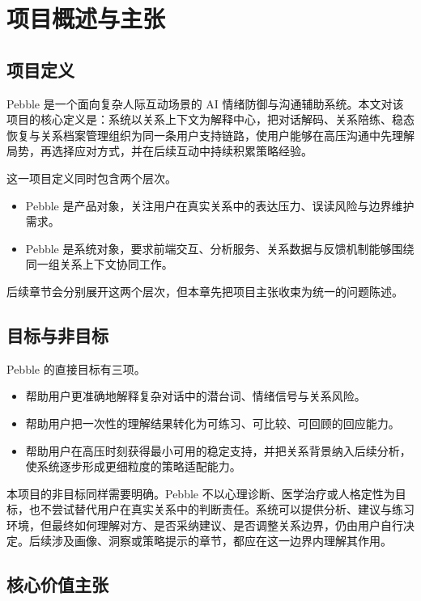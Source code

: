 \chapter{项目概述与主张}

\section{项目定义}

Pebble 是一个面向复杂人际互动场景的 AI 情绪防御与沟通辅助系统。本文对该项目的核心定义是：系统以关系上下文为解释中心，把对话解码、关系陪练、稳态恢复与关系档案管理组织为同一条用户支持链路，使用户能够在高压沟通中先理解局势，再选择应对方式，并在后续互动中持续积累策略经验。

这一项目定义同时包含两个层次。

\begin{itemize}
  \item Pebble 是产品对象，关注用户在真实关系中的表达压力、误读风险与边界维护需求。
  \item Pebble 是系统对象，要求前端交互、分析服务、关系数据与反馈机制能够围绕同一组关系上下文协同工作。
\end{itemize}

后续章节会分别展开这两个层次，但本章先把项目主张收束为统一的问题陈述。

\section{目标与非目标}

Pebble 的直接目标有三项。

\begin{itemize}
  \item 帮助用户更准确地解释复杂对话中的潜台词、情绪信号与关系风险。
  \item 帮助用户把一次性的理解结果转化为可练习、可比较、可回顾的回应能力。
  \item 帮助用户在高压时刻获得最小可用的稳定支持，并把关系背景纳入后续分析，使系统逐步形成更细粒度的策略适配能力。
\end{itemize}

本项目的非目标同样需要明确。Pebble 不以心理诊断、医学治疗或人格定性为目标，也不尝试替代用户在真实关系中的判断责任。系统可以提供分析、建议与练习环境，但最终如何理解对方、是否采纳建议、是否调整关系边界，仍由用户自行决定。后续涉及画像、洞察或策略提示的章节，都应在这一边界内理解其作用。

\section{核心价值主张}

